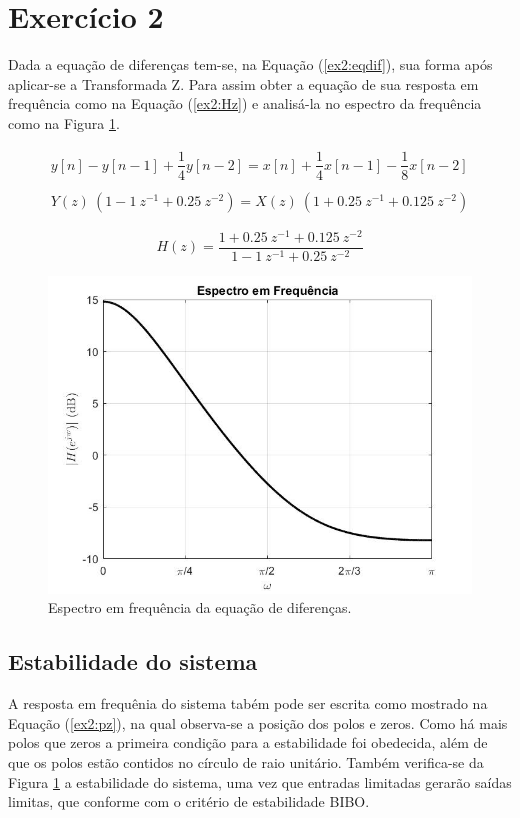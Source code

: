\documentclass[a4paper,12pt,oneside,openany,table,xcdraw]{article}
\begin{document}
\vspace{0.5cm}
\section{Exercício 2}
Dada a equação de diferenças tem-se, na Equação (\ref{ex2:eqdif}), sua forma após aplicar-se a Transformada Z. Para assim obter a equação de sua resposta em frequência como na Equação (\ref{ex2:Hz}) e analisá-la no espectro da frequência como na Figura \ref{ex2:H}.

\begin{gather} 
y[n] - y[n-1] + \dfrac{1}{4} y[n-2] = x[n] +\dfrac{1}{4} x[n-1] -\dfrac{1}{8} x[n-2] \label{ex2:eqdif} \\ \\
Y(z)\ (1 - 1\ z^{-1} + 0.25\ z^{-2}) = X(z)\ (1 + 0.25\ z^{-1} + 0.125\ z^{-2})
\end{gather}

\begin{equation} \label{ex2:Hz}
H(z) = \dfrac{1 + 0.25\ z^{-1} + 0.125\ z^{-2}}{1 - 1\ z^{-1} + 0.25\ z^{-2}}
\end{equation}

\vspace{0.3cm}
\begin{figure}[H]
\centering
\includegraphics[width=14cm]{ex2-Hz}
\caption{Espectro em frequência da equação de diferenças.}
\label{ex2:H}
\end{figure}

\vspace{0.4cm}
\subsection{Estabilidade do sistema}
A resposta em frequênia do sistema tabém pode ser escrita como mostrado na Equação (\ref{ex2:pz}), na qual observa-se a posição dos polos e zeros. Como há mais polos que zeros a primeira condição para a estabilidade foi obedecida, além de que os polos estão contidos no círculo de raio unitário. Também verifica-se da Figura  \ref{ex2:H} a estabilidade do sistema, uma vez que entradas limitadas gerarão saídas limitas, que conforme com o critério de estabilidade BIBO.
\end{document}
